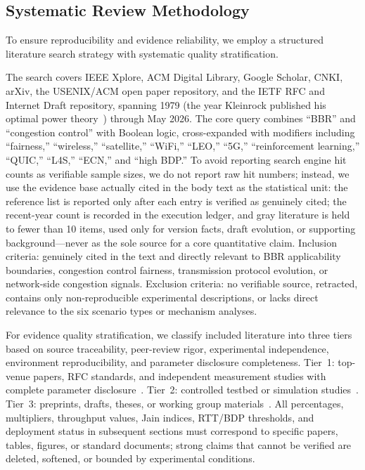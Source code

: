 \documentclass[a4paper,fleqn]{cas-sc}
\begin{document}
\subsection{Systematic Review Methodology}
\label{sec:method}

To ensure reproducibility and evidence reliability, we employ a structured
literature search strategy with systematic quality stratification.

The search covers IEEE Xplore, ACM Digital Library, Google Scholar, CNKI, arXiv,
the USENIX/ACM open paper repository, and the IETF RFC and Internet Draft
repository, spanning 1979 (the year Kleinrock published his optimal power
theory~\citep{kleinrock1979power}) through May 2026. The core query combines
``BBR'' and ``congestion control'' with Boolean logic, cross-expanded with
modifiers including ``fairness,'' ``wireless,'' ``satellite,'' ``WiFi,'' ``LEO,''
``5G,'' ``reinforcement learning,'' ``QUIC,'' ``L4S,'' ``ECN,'' and ``high BDP.''
To avoid reporting search engine hit counts as verifiable sample sizes, we do not
report raw hit numbers; instead, we use the evidence base actually cited in the
body text as the statistical unit: the reference list is reported only after each
entry is verified as genuinely cited; the recent-year count is recorded in the
execution ledger, and gray literature is held to fewer than 10 items, used only
for version facts, draft evolution, or
supporting background---never as the sole source for a core quantitative claim.
Inclusion criteria: genuinely cited in the text and directly relevant to BBR
applicability boundaries, congestion control fairness, transmission protocol
evolution, or network-side congestion signals. Exclusion criteria: no verifiable
source, retracted, contains only non-reproducible experimental descriptions, or
lacks direct relevance to the six scenario types or mechanism analyses.

For evidence quality stratification, we classify included literature into three
tiers based on source traceability, peer-review rigor, experimental independence,
environment reproducibility, and parameter disclosure completeness. Tier~1:
top-venue papers, RFC standards, and independent measurement studies with complete
parameter disclosure~\citep{jaeger2019bbr,scholz2018deeper,gomez2024bbrv3,rfc9000,rfc9002,rfc9114,rfc9330,rfc9331,rfc9332}.
Tier~2: controlled testbed or simulation
studies~\citep{hock2017bbr,piotrowska2024,cao2019bbr}. Tier~3: preprints,
drafts, theses, or working group
materials~\citep{ma2017fairness,sologon2025thesis,cardwell2019bbrv2,cardwell2023bbrv3,ietf_ccwg_bbr}.
All percentages, multipliers, throughput values, Jain indices, RTT/BDP thresholds,
and deployment status in subsequent sections must correspond to specific papers,
tables, figures, or standard documents; strong claims that cannot be verified are
deleted, softened, or bounded by experimental conditions.
\end{document}
